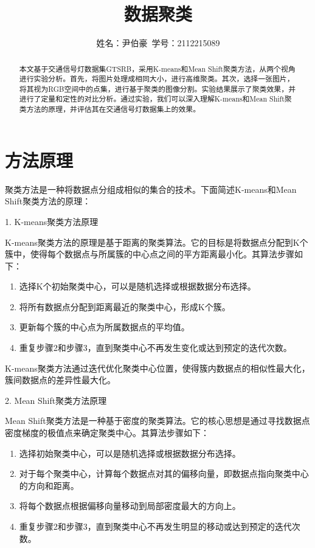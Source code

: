 \documentclass[lettersize,journal]{IEEEtran}
\begin{document}
\title{数据聚类}
\author{姓名：尹伯豪\ 学号：2112215089}



\maketitle

\begin{abstract}
本文基于交通信号灯数据集GTSRB，采用K-means和Mean Shift聚类方法，从两个视角进行实验分析。首先，将图片处理成相同大小，进行高维聚类。其次，选择一张图片，将其视为RGB空间中的点集，进行基于聚类的图像分割。实验结果展示了聚类效果，并进行了定量和定性的对比分析。通过实验，我们可以深入理解K-means和Mean Shift聚类方法的原理，并评估其在交通信号灯数据集上的效果。
\end{abstract}



\section{方法原理}

聚类方法是一种将数据点分组成相似的集合的技术。下面简述K-means和Mean Shift聚类方法的原理：

1. K-means聚类方法原理

K-means聚类方法的原理是基于距离的聚类算法。它的目标是将数据点分配到K个簇中，使得每个数据点与所属簇的中心点之间的平方距离最小化。其算法步骤如下：

\begin{enumerate}
    \item 选择K个初始聚类中心，可以是随机选择或根据数据分布选择。
    \item 将所有数据点分配到距离最近的聚类中心，形成K个簇。
    \item 更新每个簇的中心点为所属数据点的平均值。
    \item 重复步骤2和步骤3，直到聚类中心不再发生变化或达到预定的迭代次数。
\end{enumerate}

K-means聚类方法通过迭代优化聚类中心位置，使得簇内数据点的相似性最大化，簇间数据点的差异性最大化。

2. Mean Shift聚类方法原理

Mean Shift聚类方法是一种基于密度的聚类算法。它的核心思想是通过寻找数据点密度梯度的极值点来确定聚类中心。其算法步骤如下：

\begin{enumerate}
    \item 选择初始聚类中心，可以是随机选择或根据数据分布选择。
    \item 对于每个聚类中心，计算每个数据点对其的偏移向量，即数据点指向聚类中心的方向和距离。
    \item 将每个数据点根据偏移向量移动到局部密度最大的方向上。
    \item 重复步骤2和步骤3，直到聚类中心不再发生明显的移动或达到预定的迭代次数。
\end{enumerate}
\end{document}
